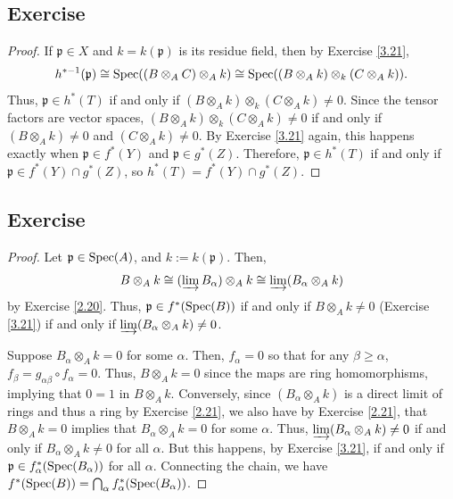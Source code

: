 \subsection{Exercise}\label{3.25}

\begin{proof}
If $\mathfrak{p} \in X$ and $k = k(\mathfrak{p})$ is its residue field, then by Exercise \ref{3.21},
$$h^{*-1}(\mathfrak{p}) \cong \operatorname{Spec}((B \otimes_A C) \otimes_A k) \cong \operatorname{Spec}((B \otimes_A k) \otimes_k (C \otimes_A k)).$$
Thus, $\mathfrak{p} \in h^*(T)$ if and only if $(B \otimes_A k) \otimes_k (C \otimes_A k) \neq 0$. Since the tensor factors are vector spaces,
$(B \otimes_A k) \otimes_k (C \otimes_A k) \neq 0$ if and only if $(B \otimes_A k) \neq 0$ and $(C \otimes_A k) \neq 0$. By Exercise \ref{3.21} again, this
happens exactly when $\mathfrak{p} \in f^*(Y)$ and $\mathfrak{p} \in g^*(Z)$. Therefore, $\mathfrak{p} \in h^*(T)$ if and only if $\mathfrak{p} \in f^*(Y) \cap g^*(Z)$, 
so $h^*(T) = f^*(Y) \cap g^*(Z)$.
\end{proof}

\subsection{Exercise}\label{3.26}

\begin{proof}
Let $\mathfrak{p} \in \operatorname{Spec}(A)$, and $k := k(\mathfrak{p})$. Then,
$$B \otimes_A k \cong (\varinjlim B_{\alpha}) \otimes_A k \cong \varinjlim (B_{\alpha} \otimes_A k)$$
by Exercise \ref{2.20}. Thus, $\mathfrak{p} \in f^*(\operatorname{Spec}(B))$ if and only if $B \otimes_A k \neq 0$ (Exercise \ref{3.21}) if and only if $\varinjlim (B_{\alpha} \otimes_A k) \neq 0$.

Suppose $B_{\alpha} \otimes_A k = 0$ for some $\alpha$. Then, $f_{\alpha} = 0$ so that for any $\beta \ge \alpha$, $f_{\beta} = g_{\alpha\beta} \circ f_{\alpha} = 0$. Thus, $B \otimes_A k = 0$ since the maps
are ring homomorphisms, implying that $0=1$ in $B \otimes_A k$. Conversely, since $(B_{\alpha} \otimes_A k)$ is a direct limit of rings and thus a ring by Exercise \ref{2.21}, we also have by Exercise \ref{2.21}, 
that $B \otimes_A k = 0$ implies that $B_{\alpha} \otimes_A k = 0$ for some $\alpha$. Thus, $\varinjlim (B_{\alpha} \otimes_A k) \neq 0$ if and only if $B_{\alpha} \otimes_A k \neq 0$ for all $\alpha$. But this
happens, by Exercise \ref{3.21}, if and only if $\mathfrak{p} \in f_{\alpha}^*(\operatorname{Spec}(B_{\alpha}))$ for all $\alpha$. Connecting the chain, we have $f^*(\operatorname{Spec}(B)) = \bigcap_{\alpha} f_{\alpha}^*(\operatorname{Spec}(B_{\alpha}))$.
\end{proof}

